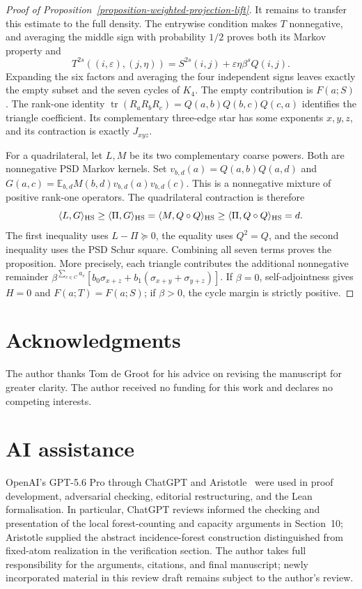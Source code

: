 \documentclass[a4paper,11pt,reqno]{amsart}
\theoremstyle{plain}
\theoremstyle{definition}
\theoremstyle{remark}
\begin{document}
\begin{proof}[Proof of Proposition~\ref{proposition-weighted-projection-lift}]
It remains to transfer this estimate to the full density.
The entrywise condition makes $T$ nonnegative, and averaging the middle
sign with probability $1/2$ proves both its Markov property and
\[
 T^{2s}((i,\varepsilon),(j,\eta))
       =S^{2s}(i,j)+\varepsilon\eta\beta^sQ(i,j).
\]
Expanding the six factors and averaging the four independent signs
leaves exactly the empty subset and the seven cycles of $K_4$.
The empty contribution is $F(a;S)$.  The rank-one identity
$\operatorname{tr}(R_aR_bR_c)=Q(a,b)Q(b,c)Q(c,a)$
identifies the triangle coefficient.  Its complementary
three-edge star has some exponents $x,y,z$, and its contraction is
exactly $J_{xyz}$.

For a quadrilateral, let $L,M$ be its two complementary coarse powers.
Both are nonnegative PSD Markov kernels.  Set
$v_{b,d}(a)=Q(a,b)Q(a,d)$ and
$G(a,c)=\mathbb E_{b,d}M(b,d)v_{b,d}(a)v_{b,d}(c)$.
This is a nonnegative mixture of positive rank-one operators.
The quadrilateral contraction is therefore
\[
 \langle L,G\rangle_{\rm HS}
 \ge\langle\Pi,G\rangle_{\rm HS}
 =\langle M,Q\circ Q\rangle_{\rm HS}
 \ge\langle\Pi,Q\circ Q\rangle_{\rm HS}=d.
\]
The first inequality uses $L-\Pi\succeq0$, the equality uses
$Q^2=Q$, and the second inequality uses the PSD Schur square.
Combining all seven terms proves the proposition.  More precisely,
each triangle contributes the additional nonnegative remainder
$\beta^{\sum_{e\in C}a_e}
[b_0\sigma_{x+z}+b_1(\sigma_{x+y}+\sigma_{y+z})]$.
If $\beta=0$, self-adjointness gives $H=0$ and $F(a;T)=F(a;S)$;
if $\beta>0$, the cycle margin is strictly positive.
\end{proof}

\section*{Acknowledgments}

The author thanks Tom de Groot for his advice on revising the manuscript for
greater clarity.
The author received no funding for this work and declares no competing
interests.

\section*{AI assistance}

OpenAI's GPT-5.6 Pro through ChatGPT and Aristotle~\citep{achim-et-al-2025}
were used in proof development, adversarial checking, editorial
restructuring, and the Lean formalisation.  In particular, ChatGPT reviews
informed the checking and presentation of the local forest-counting and
capacity arguments in Section~10; Aristotle supplied the abstract
incidence-forest construction distinguished from fixed-atom realization in
the verification section.  The author takes full responsibility for the
arguments, citations, and final manuscript; newly incorporated material in
this review draft remains subject to the author's review.
\end{document}
